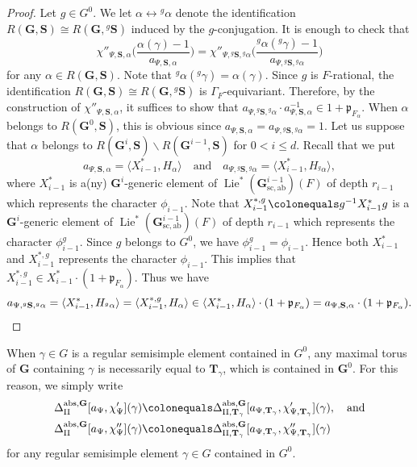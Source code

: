 \documentclass{amsart}
\newcommand{\ab}{\mathrm{ab}}
\newcommand{\abs}{\mathrm{abs}}
\renewcommand{\sc}{\mathrm{sc}}
\newcommand{\mfp}{\mathfrak{p}}
\newcommand{\bfT}{\mathbf{T}}
\newcommand{\bfG}{\mathbf{G}}
\newcommand{\bfS}{\mathbf{S}}
\newcommand{\II}{\mathrm{II}}
\DeclareMathOperator{\Lie}{Lie}
\theoremstyle{plain}
\theoremstyle{definition}
\theoremstyle{remark}
\theoremstyle{theorem}
\begin{document}
\begin{proof}
Let $g\in G^{0}$.
We let $\alpha\leftrightarrow{}^{g}\alpha$ denote the identification $R(\bfG,\bfS)\cong R(\bfG,{}^{g}\bfS)$ induced by the $g$-conjugation.
It is enough to check that 
\[
\chi''_{\Psi,\bfS,\alpha}\biggl(\frac{\alpha(\gamma)-1}{a_{\Psi,\bfS,\alpha}}\biggr)
=
\chi''_{\Psi,{}^{g}\bfS,{}^{g}\alpha}\biggl(\frac{{}^{g}\alpha({}^{g}\gamma)-1}{a_{\Psi,{}^{g}\bfS,{}^{g}\alpha}}\biggr)
\]
for any $\alpha\in R(\bfG,\bfS)$.
Note that ${}^{g}\alpha({}^{g}\gamma)=\alpha(\gamma)$.
Since $g$ is $F$-rational, the identification $R(\bfG,\bfS)\cong R(\bfG,{}^{g}\bfS)$ is $\Gamma_{F}$-equivariant.
Therefore, by the construction of $\chi''_{\Psi,\bfS,\alpha}$, it suffices to show that $a_{\Psi,{}^{g}\bfS,{}^{g}\alpha}\cdot a_{\Psi,\bfS,\alpha}^{-1}\in 1+\mfp_{F_{\alpha}}$.
When $\alpha$ belongs to $R(\bfG^{0},\bfS)$, this is obvious since $a_{\Psi,\bfS,\alpha}=a_{\Psi,{}^{g}\bfS,{}^{g}\alpha}=1$.
Let us suppose that $\alpha$ belongs to $R(\bfG^{i},\bfS)\smallsetminus R(\bfG^{i-1},\bfS)$ for $0<i\leq d$.
Recall that we put
\[
a_{\Psi,\bfS,\alpha}
=\langle X^{\ast}_{i-1},H_{\alpha}\rangle
\quad\text{and}\quad
a_{\Psi,{}^{g}\bfS,{}^{g}\alpha}
=\langle X^{\ast}_{i-1},H_{{}^{g}\alpha}\rangle,
\]
where $X^{\ast}_{i-1}$ is a(ny) $\bfG^{i}$-generic element of $\Lie^{\ast}(\bfG^{i-1}_{\sc,\ab})(F)$ of depth $r_{i-1}$ which represents the character $\phi_{i-1}$.
Note that $X^{\ast,g}_{i-1}\colonequals g^{-1}X^{\ast}_{i-1}g$ is a $\bfG^{i}$-generic element of $\Lie^{\ast}(\bfG^{i-1}_{\sc,\ab})(F)$ of depth $r_{i-1}$ which represents the character $\phi_{i-1}^{g}$.
Since $g$ belongs to $G^{0}$, we have $\phi_{i-1}^{g}=\phi_{i-1}$.
Hence both $X^{\ast}_{i-1}$ and $X^{\ast,g}_{i-1}$ represents the character $\phi_{i-1}$.
This implies that $X^{\ast,g}_{i-1}\in X^{\ast}_{i-1}\cdot(1+\mfp_{F_{\alpha}})$.
Thus we have
\[
a_{\Psi,{}^{g}\bfS,{}^{g}\alpha}
=\langle X^{\ast}_{i-1},H_{{}^{g}\alpha}\rangle
=\langle X^{\ast,g}_{i-1},H_{\alpha}\rangle
\in\langle X^{\ast}_{i-1},H_{\alpha}\rangle\cdot(1+\mfp_{F_{\alpha}})
=a_{\Psi,\bfS,\alpha}\cdot(1+\mfp_{F_{\alpha}}). \qedhere
\]
\end{proof}


When $\gamma\in G$ is a regular semisimple element contained in $G^{0}$, any maximal torus of $\bfG$ containing $\gamma$ is necessarily equal to $\bfT_{\gamma}$, which is contained in $\bfG^{0}$.
For this reason, we simply write
\begin{align*}
\Delta_{\II}^{\abs,\bfG}[a_{\Psi},\chi'_{\Psi}](\gamma)
&\colonequals \Delta_{\II,\bfT_{\gamma}}^{\abs,\bfG}[a_{\Psi,\bfT_{\gamma}},\chi'_{\Psi,\bfT_{\gamma}}](\gamma),
\quad\text{and}\\
\Delta_{\II}^{\abs,\bfG}[a_{\Psi},\chi''_{\Psi}](\gamma)
&\colonequals \Delta_{\II,\bfT_{\gamma}}^{\abs,\bfG}[a_{\Psi,\bfT_{\gamma}},\chi''_{\Psi,\bfT_{\gamma}}](\gamma)
\end{align*}
for any regular semisimple element $\gamma\in G$ contained in $G^{0}$.
\end{document}
